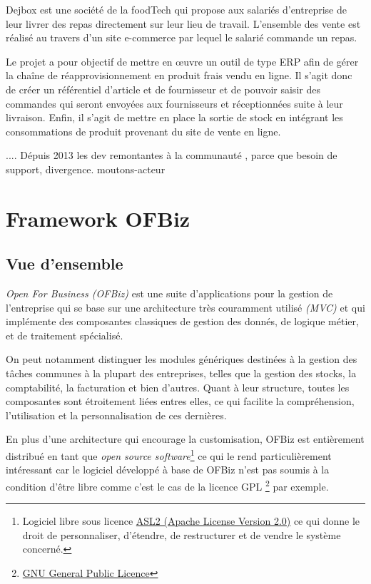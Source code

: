 Dejbox est une société de la foodTech qui propose aux salariés d’entreprise de leur livrer des repas directement sur leur lieu de travail. L’ensemble des vente est réalisé au travers d’un site e-commerce par lequel le salarié commande un repas.

Le projet a pour objectif de mettre en œuvre un outil de type ERP afin de gérer la chaîne de réapprovisionnement en produit frais vendu en ligne. Il s’agit donc de créer un référentiel d’article et de fournisseur et de pouvoir saisir des commandes qui seront envoyées aux fournisseurs et réceptionnées suite à leur livraison. Enfin, il s’agit de mettre en place la sortie de stock en intégrant les consommations de produit provenant du site de vente en ligne.


....
Dépuis 2013 les dev remontantes à la communauté , parce que besoin de support,  divergence. moutons-acteur 







\section{Framework OFBiz}
\subsection{Vue d'ensemble }
\emph{Open For Business (OFBiz)} est une suite d'applications pour la gestion de l'entreprise qui se base sur une architecture très couramment utilisé \emph{(MVC)} et qui implémente des composantes classiques de gestion des donnés, de logique métier, et de traitement spécialisé. 

On peut notamment distinguer les modules génériques destinées à la gestion des tâches communes à la plupart des entreprises, telles que la gestion des stocks, la comptabilité, la facturation et bien d'autres. Quant à leur structure, toutes les composantes sont étroitement liées entres elles, ce qui facilite la compréhension, l'utilisation et la personnalisation de ces dernières. 


En plus d'une architecture qui encourage la customisation, OFBiz est entièrement distribué en tant que \emph{open source software}\footnote{Logiciel libre sous licence \href{https://www.apache.org/licenses/LICENSE-2.0.html}{ASL2 (Apache License Version 2.0)} ce qui donne le droit de personnaliser, d'étendre, de restructurer et de vendre le système concerné. } ce qui le rend particulièrement intéressant car le logiciel développé à base de OFBiz n'est pas soumis à la condition d'être libre comme c'est le cas de la licence GPL  \footnote{\href{http://www.gnu.org/licenses/gpl-3.0.html}{GNU General Public Licence}} par exemple.

